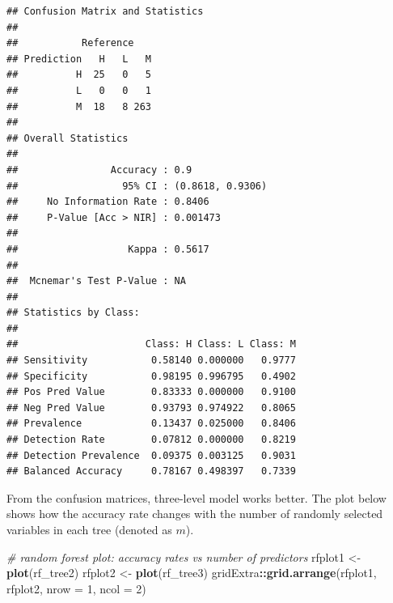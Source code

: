 \documentclass[
]{book}
\newenvironment{Shaded}{\begin{snugshade}}{\end{snugshade}}
\newcommand{\AttributeTok}[1]{\textcolor[rgb]{0.13,0.29,0.53}{#1}}
\newcommand{\CommentTok}[1]{\textcolor[rgb]{0.56,0.35,0.01}{\textit{#1}}}
\newcommand{\DecValTok}[1]{\textcolor[rgb]{0.00,0.00,0.81}{#1}}
\newcommand{\FunctionTok}[1]{\textcolor[rgb]{0.13,0.29,0.53}{\textbf{#1}}}
\newcommand{\NormalTok}[1]{#1}
\newcommand{\OtherTok}[1]{\textcolor[rgb]{0.56,0.35,0.01}{#1}}
\newcommand{\SpecialCharTok}[1]{\textcolor[rgb]{0.81,0.36,0.00}{\textbf{#1}}}
\begin{document}
\begin{Shaded}
\end{Shaded}

\begin{verbatim}
## Confusion Matrix and Statistics
## 
##           Reference
## Prediction   H   L   M
##          H  25   0   5
##          L   0   0   1
##          M  18   8 263
## 
## Overall Statistics
##                                           
##                Accuracy : 0.9             
##                  95% CI : (0.8618, 0.9306)
##     No Information Rate : 0.8406          
##     P-Value [Acc > NIR] : 0.001473        
##                                           
##                   Kappa : 0.5617          
##                                           
##  Mcnemar's Test P-Value : NA              
## 
## Statistics by Class:
## 
##                      Class: H Class: L Class: M
## Sensitivity           0.58140 0.000000   0.9777
## Specificity           0.98195 0.996795   0.4902
## Pos Pred Value        0.83333 0.000000   0.9100
## Neg Pred Value        0.93793 0.974922   0.8065
## Prevalence            0.13437 0.025000   0.8406
## Detection Rate        0.07812 0.000000   0.8219
## Detection Prevalence  0.09375 0.003125   0.9031
## Balanced Accuracy     0.78167 0.498397   0.7339
\end{verbatim}

From the confusion matrices, three-level model works better. The plot below shows how the accuracy rate changes with the number of randomly selected variables in each tree (denoted as \(m\)).

\begin{Shaded}
\begin{Highlighting}[]
\CommentTok{\# random forest plot: accuracy rates vs number of predictors}
\NormalTok{rfplot1 }\OtherTok{\textless{}{-}} \FunctionTok{plot}\NormalTok{(rf\_tree2)}
\NormalTok{rfplot2 }\OtherTok{\textless{}{-}} \FunctionTok{plot}\NormalTok{(rf\_tree3)}
\NormalTok{gridExtra}\SpecialCharTok{::}\FunctionTok{grid.arrange}\NormalTok{(rfplot1, rfplot2, }\AttributeTok{nrow =} \DecValTok{1}\NormalTok{, }\AttributeTok{ncol =} \DecValTok{2}\NormalTok{)}
\end{Highlighting}
\end{Shaded}
\end{document}
